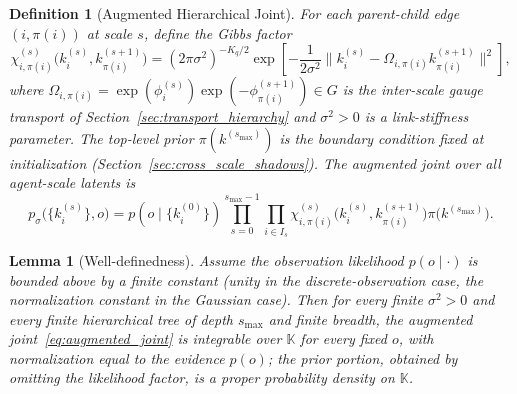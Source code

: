 \documentclass[11pt]{article}
\newtheorem{lemma}{Lemma}
\newtheorem{definition}{Definition}
\begin{document}
\begin{definition}[Augmented Hierarchical Joint]
\label{def:augmented_joint}
For each parent-child edge $(i, \pi(i))$ at scale $s$, define the Gibbs factor
\begin{equation}
\chi_{i,\pi(i)}^{(s)}\big(k_i^{(s)}, k_{\pi(i)}^{(s+1)}\big)
=
(2\pi\sigma^2)^{-K_q/2} \exp\left[-\frac{1}{2\sigma^2}
\big\|k_i^{(s)} - \Omega_{i,\pi(i)}  k_{\pi(i)}^{(s+1)}\big\|^2\right],
\label{eq:gibbs_factor}
\end{equation}
where $\Omega_{i,\pi(i)} = \exp(\phi_i^{(s)})\exp(-\phi_{\pi(i)}^{(s+1)}) \in G$ is the inter-scale gauge transport of Section~\ref{sec:transport_hierarchy} and $\sigma^2 > 0$ is a link-stiffness parameter. The top-level prior $\pi(k^{(s_{\max})})$ is the boundary condition fixed at initialization (Section~\ref{sec:cross_scale_shadows}). The augmented joint over all agent-scale latents is
\begin{equation}
p_{\sigma}\big(\{k_i^{(s)}\}, o\big)
=
p(o \mid \{k_i^{(0)}\}) \prod_{s = 0}^{s_{\max}-1} \prod_{i \in I_s} \chi_{i,\pi(i)}^{(s)}\big(k_i^{(s)}, k_{\pi(i)}^{(s+1)}\big)  \pi\big(k^{(s_{\max})}\big).
\label{eq:augmented_joint}
\end{equation}
\end{definition}

\begin{lemma}[Well-definedness]
\label{lem:aug_joint_welldefined}
Assume the observation likelihood $p(o \mid \cdot)$ is bounded above by a finite constant (unity in the discrete-observation case, the normalization constant in the Gaussian case). Then for every finite $\sigma^2 > 0$ and every finite hierarchical tree of depth $s_{\max}$ and finite breadth, the augmented joint~\eqref{eq:augmented_joint} is integrable over $\mathbb{K}$ for every fixed $o$, with normalization equal to the evidence $p(o)$; the prior portion, obtained by omitting the likelihood factor, is a proper probability density on $\mathbb{K}$.
\end{lemma}
\end{document}
